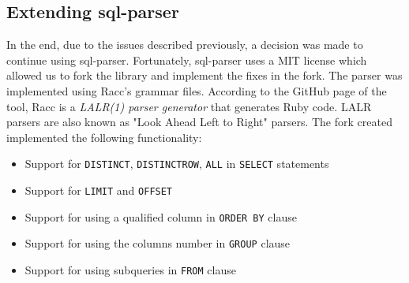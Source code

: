 \subsection{Extending sql-parser}

In the end, due to the issues described previously, a decision was made to continue using sql-parser. Fortunately, sql-parser uses a MIT license which allowed us to fork the library and implement the fixes in the fork. The parser was implemented using Racc's grammar files. According to the GitHub page of the tool, Racc is a \textit{LALR(1) parser generator} that generates Ruby code. LALR parsers are also known as "Look Ahead Left to Right" parsers. The fork created implemented the following functionality:
\begin{itemize}
    \item Support for \texttt{DISTINCT}, \texttt{DISTINCTROW}, \texttt{ALL} in \texttt{SELECT} statements
    \item Support for \texttt{LIMIT} and \texttt{OFFSET}
    \item Support for using a qualified column in \texttt{ORDER BY} clause
    \item Support for using the columns number in \texttt{GROUP} clause
    \item Support for using subqueries in \texttt{FROM} clause
\end{itemize}

